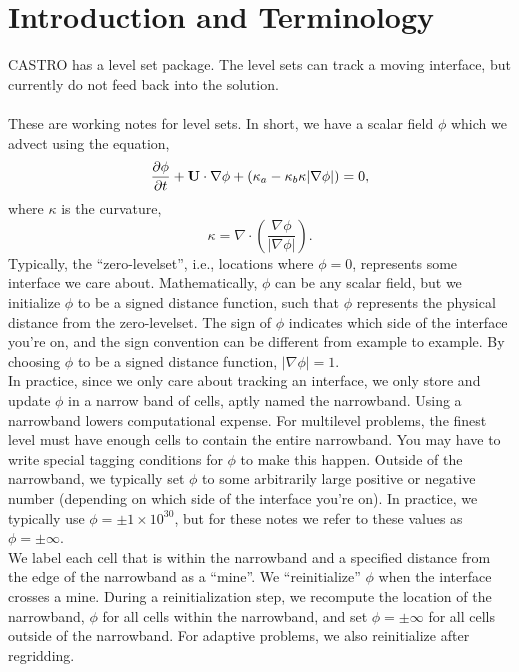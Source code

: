 \section{Introduction and Terminology}
CASTRO has a level set package.  The level sets can track a moving interface, but currently do not feed back into the solution.\\ \\

These are working notes for level sets.  In short, we have a scalar field $\phi$ which we advect using the equation,
\begin{equation}
\frac{\partial\phi}{\partial t} + {\bf U}\cdot\nabla\phi + (\kappa_a-\kappa_b\kappa|\nabla\phi|) = 0,
\end{equation}
where $\kappa$ is the curvature,
\begin{equation}
\kappa = \nabla\cdot\left(\frac{\nabla\phi}{|\nabla\phi|}\right).
\end{equation}
Typically, the ``zero-levelset'', i.e., locations where $\phi=0$, represents some interface we care about.  Mathematically, $\phi$ can be any scalar field, but we initialize $\phi$ to be a signed distance function, such that $\phi$ represents the physical distance from the zero-levelset.  The sign of $\phi$ indicates which side of the interface you're on, and the sign convention can be different from example to example.  By choosing $\phi$ to be a signed distance function, $|\nabla\phi|=1$.\\

In practice, since we only care about tracking an interface, we only store and update $\phi$ in a narrow band of cells, aptly named the narrowband.  Using a narrowband lowers computational expense.  For multilevel problems, the finest level must have enough cells to contain the entire narrowband.  You may have to write special tagging conditions for $\phi$ to make this happen.  Outside of the narrowband, we typically set $\phi$ to some arbitrarily large positive or negative number (depending on which side of the interface you're on).  In practice, we typically use $\phi=\pm 1\times 10^{30}$, but for these notes we refer to these values as $\phi=\pm\infty$.\\

We label each cell that is within the narrowband and a specified distance from the edge of the narrowband as a ``mine''.  We ``reinitialize'' $\phi$ when the interface crosses a mine.  During a reinitialization step, we recompute the location of the narrowband, $\phi$ for all cells within the narrowband, and set $\phi=\pm\infty$ for all cells outside of the narrowband.  For adaptive problems, we also reinitialize after regridding.\\

